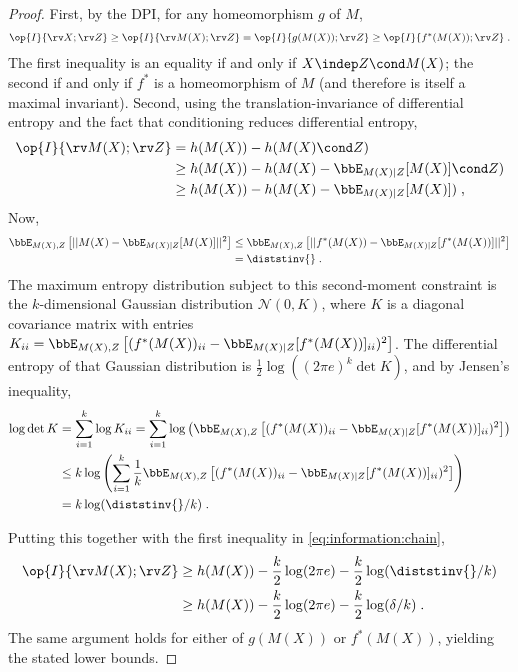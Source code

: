 \documentclass[final]{article}
\begin{document}
\begin{proof}
	First, by the DPI, for any homeomorphism $g$ of $M$,
	\begin{align*}
		\op{I}{\rv X; \rv Z} \geq \op{I}{\rv M(X); \rv Z} = \op{I}{ g(M(X)); \rv Z} \geq  \op{I}{ f^*(M(X)); \rv Z} \;.
	\end{align*}
	The first inequality is an equality if and only if $X \indep Z \cond M(X)$; the second if and only if $f^*$ is a homeomorphism of $M$ (and therefore is itself a maximal invariant). Second, using the translation-invariance of differential entropy and the fact that conditioning reduces differential entropy, 
	\begin{align} \label{eq:information:chain}
		\op{I}{\rv M(X); \rv Z} & = h(M(X)) - h(M(X) \cond Z) \\
			& \geq h(M(X)) - h(M(X) - \bbE_{M(X)|Z}[M(X)] \cond Z) \\
			& \geq h(M(X)) - h(M(X) - \bbE_{M(X)|Z}[M(X)]) \;,
	\end{align}
	Now, 
	\begin{align*}
		\bbE_{M(X),Z}\left[ ||M(X) - \bbE_{M(X)|Z}[M(X)]||^2 \right] & \leq \bbE_{M(X),Z}\left[ || f^*(M(X)) - \bbE_{M(X)|Z}[f^*(M(X))] ||^2 \right] \\
		& = \diststinv{} \;. \end{align*}
	The maximum entropy distribution subject to this second-moment constraint is the $k$-dimensional Gaussian distribution $\mathcal{N}(0, K)$, where $K$ is a diagonal covariance matrix with entries $K_{ii} = \bbE_{M(X),Z}\left[ (f^*(M(X))_{ii} - \bbE_{M(X)|Z}[f^*(M(X))]_{ii})^2 \right]$. The differential entropy of that Gaussian distribution is $\frac{1}{2}\log\left( (2\pi e)^k \det{K} \right)$, and by Jensen's inequality,
	\begin{align*}
		\log\det{K} & = \sum_{i=1}^k \log K_{ii} = \sum_{i=1}^k \log \left( \bbE_{M(X),Z}\left[ (f^*(M(X))_{ii} - \bbE_{M(X)|Z}[f^*(M(X))]_{ii})^2 \right] \right) \\
		& \leq k \log \left( \sum_{i=1}^k  \frac{1}{k} \bbE_{M(X),Z}\left[ (f^*(M(X))_{ii} - \bbE_{M(X)|Z}[f^*(M(X))]_{ii})^2 \right] \right) \\
		& = k\log (\diststinv{}/k) \;.
	\end{align*}

	Putting this together with the first inequality in \eqref{eq:information:chain},
	\begin{align*}
		\op{I}{\rv M(X); \rv Z} & \geq h(M(X)) - \frac{k}{2} \log(2\pi e) - \frac{k}{2}\log (\diststinv{}/k) \\
		& \geq h(M(X)) - \frac{k}{2} \log(2\pi e) - \frac{k}{2}\log(\delta/k) \;.
	\end{align*}
	The same argument holds for either of $g(M(X))$ or $f^*(M(X))$, yielding the stated lower bounds.
\end{proof}
\end{document}
